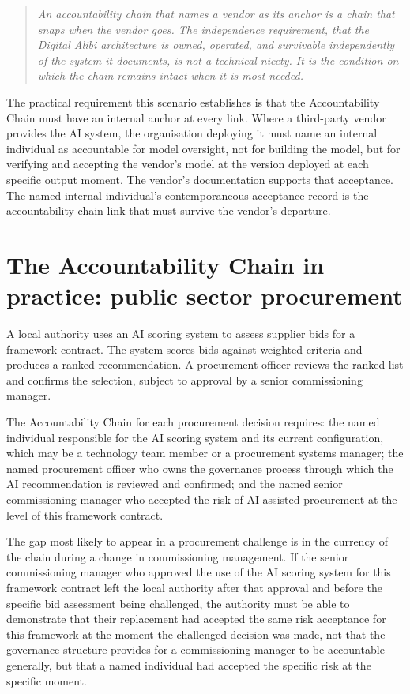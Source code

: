 \begin{quote}
\emph{An accountability chain that names a vendor as its anchor is a chain that snaps when the vendor goes. The independence requirement, that the Digital Alibi architecture is owned, operated, and survivable independently of the system it documents, is not a technical nicety. It is the condition on which the chain remains intact when it is most needed.}
\end{quote}

The practical requirement this scenario establishes is that the Accountability Chain must have an internal anchor at every link. Where a third-party vendor provides the AI system, the organisation deploying it must name an internal individual as accountable for model oversight, not for building the model, but for verifying and accepting the vendor's model at the version deployed at each specific output moment. The vendor's documentation supports that acceptance. The named internal individual's contemporaneous acceptance record is the accountability chain link that must survive the vendor's departure.

\section{The Accountability Chain in practice: public sector procurement}

A local authority uses an AI scoring system to assess supplier bids for a framework contract. The system scores bids against weighted criteria and produces a ranked recommendation. A procurement officer reviews the ranked list and confirms the selection, subject to approval by a senior commissioning manager.

The Accountability Chain for each procurement decision requires: the named individual responsible for the AI scoring system and its current configuration, which may be a technology team member or a procurement systems manager; the named procurement officer who owns the governance process through which the AI recommendation is reviewed and confirmed; and the named senior commissioning manager who accepted the risk of AI-assisted procurement at the level of this framework contract.

The gap most likely to appear in a procurement challenge is in the currency of the chain during a change in commissioning management. If the senior commissioning manager who approved the use of the AI scoring system for this framework contract left the local authority after that approval and before the specific bid assessment being challenged, the authority must be able to demonstrate that their replacement had accepted the same risk acceptance for this framework at the moment the challenged decision was made, not that the governance structure provides for a commissioning manager to be accountable generally, but that a named individual had accepted the specific risk at the specific moment.

